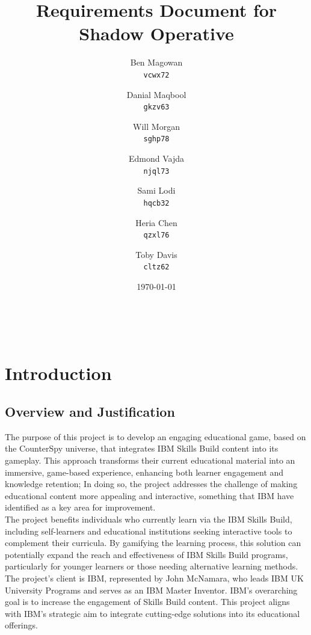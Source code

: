 \documentclass[11pt, a4paper]{article}
\title{Requirements Document for Shadow Operative}
\date{\today}
\author{
    Ben Magowan \\
    \texttt{vcwx72}
    \and
    Danial Maqbool \\
    \texttt{gkzv63}
    \and
    Will Morgan \\
    \texttt{sghp78}
    \and
    Edmond Vajda \\
    \texttt{njql73} \\
    \and
    Sami Lodi \\
    \texttt{hqcb32}
    \and
    Heria Chen \\
    \texttt{qzxl76}
    \and
    Toby Davis \\
    \texttt{cltz62}
}
\begin{document}
\maketitle

\begin{center}
     \\
\end{center}

\newpage

\section{Introduction}

\subsection{Overview and Justification}

\noindent The purpose of this project is to develop an engaging educational game, based on the CounterSpy universe, that integrates IBM Skills Build content into its gameplay. This approach transforms their current educational material into an immersive, game-based experience, enhancing both learner engagement and knowledge retention; In doing so, the project addresses the challenge of making educational content more appealing and interactive, something that IBM have identified as a key area for improvement. \\

\noindent The project benefits individuals who currently learn via the IBM Skills Build, including self-learners and educational institutions seeking interactive tools to complement their curricula. By gamifying the learning process, this solution can potentially expand the reach and effectiveness of IBM Skills Build programs, particularly for younger learners or those needing alternative learning methods. \\

\noindent The project’s client is IBM, represented by John McNamara, who leads IBM UK University Programs and serves as an IBM Master Inventor. IBM’s overarching goal is to increase the engagement of Skills Build content. This project aligns with IBM’s strategic aim to integrate cutting-edge solutions into its educational offerings.

\newpage

\tableofcontents
\end{document}
